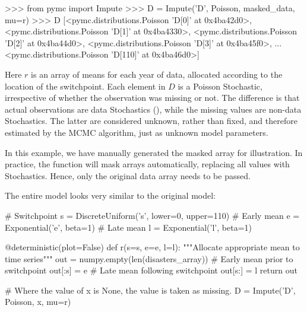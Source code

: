 \documentclass[]{jss}
\begin{document}
\begin{CodeInput}
>>> from pymc import Impute
>>> D = Impute('D', Poisson, masked_data, mu=r)
>>> D
[<pymc.distributions.Poisson 'D[0]' at 0x4ba42d0>,
 <pymc.distributions.Poisson 'D[1]' at 0x4ba4330>,
 <pymc.distributions.Poisson 'D[2]' at 0x4ba44d0>,
 <pymc.distributions.Poisson 'D[3]' at 0x4ba45f0>,
...
 <pymc.distributions.Poisson 'D[110]' at 0x4ba46d0>]
\end{CodeInput}

Here $r$ is an array of means for each year of data, allocated according to the location of the switchpoint. Each element in $D$ is a Poisson Stochastic, irrespective of whether the observation was missing or not. The difference is that actual observations are data Stochastics (), while the missing values are non-data Stochastics. The latter are considered unknown, rather than fixed, and therefore estimated by the MCMC algorithm, just as unknown model parameters.

In this example, we have manually generated the masked array for illustration. In practice, the  function will mask arrays automatically, replacing all  values with Stochastics. Hence, only the original data array needs to be passed.

The entire model looks very similar to the original model:

\begin{CodeInput}
# Switchpoint
s = DiscreteUniform('s', lower=0, upper=110)
# Early mean
e = Exponential('e', beta=1)
# Late mean
l = Exponential('l', beta=1)

@deterministic(plot=False)
def r(s=s, e=e, l=l):
    """Allocate appropriate mean to time series"""
    out = numpy.empty(len(disasters_array))
    # Early mean prior to switchpoint
    out[:s] = e
    # Late mean following switchpoint
    out[s:] = l
    return out

# Where the value of x is None, the value is taken as missing.
D = Impute('D', Poisson, x, mu=r)
\end{CodeInput}
\end{document}
